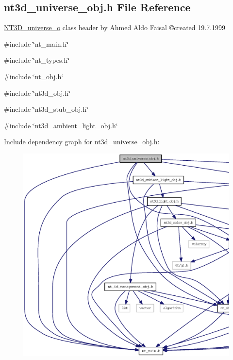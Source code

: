 \subsection{nt3d\_\-universe\_\-obj.h File Reference}
\label{nt3d__universe__obj_8h}



\begin{DoxyItemize}
\item \hyperlink{class_n_t3_d__universe__o}{NT3D\_\-universe\_\-o} class header by Ahmed Aldo Faisal \copyright created 19.7.1999 
\end{DoxyItemize} 


{\ttfamily \#include \char`\"{}nt\_\-main.h\char`\"{}}\par
{\ttfamily \#include \char`\"{}nt\_\-types.h\char`\"{}}\par
{\ttfamily \#include \char`\"{}nt\_\-obj.h\char`\"{}}\par
{\ttfamily \#include \char`\"{}nt3d\_\-obj.h\char`\"{}}\par
{\ttfamily \#include \char`\"{}nt3d\_\-stub\_\-obj.h\char`\"{}}\par
{\ttfamily \#include \char`\"{}nt3d\_\-ambient\_\-light\_\-obj.h\char`\"{}}\par
Include dependency graph for nt3d\_\-universe\_\-obj.h:
\nopagebreak
\begin{figure}[H]
\begin{center}
\leavevmode
\includegraphics[width=400pt]{nt3d__universe__obj_8h__incl}
\end{center}
\end{figure}
